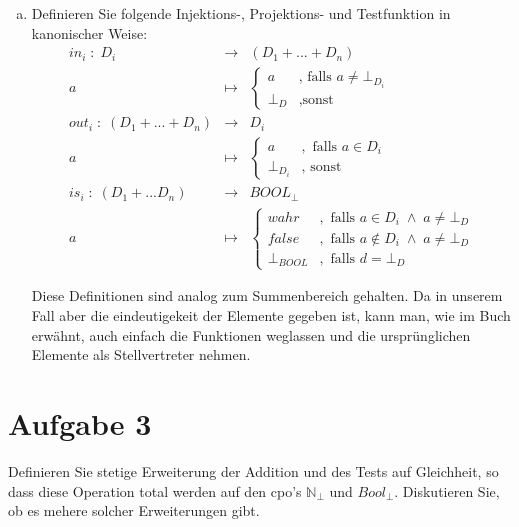 \documentclass[11pt,a4paper,ngerman]{article}
\begin{document}
\begin{enumerate}[(a)]
	\item Definieren Sie folgende Injektions-, Projektions- und Testfunktion in kanonischer Weise:\\
		$$\begin{array}{rcl}
			in_i \; : \; D_i &\longrightarrow& (D_1 + ... + D_n)\\
				a & \longmapsto & \left\{ \begin{array}{lr} a &\text{, falls }a\not= \bot_{D_i} \\ \bot_D &, \text{sonst} \end{array} \right.\\
			out_i \; : \; (D_1 + ... + D_n) &\longrightarrow& D_i\\
				a & \longmapsto & \left\{ \begin{array}{lr} a &,\text{ falls } a \in D_i \\ \bot_{D_i} &, \text{ sonst }\end{array} \right.\\
			is_i \; : \; (D_1 + ... D_n) &\longrightarrow& BOOL_\bot\\
				a & \longmapsto& \left\{ \begin{array}{lr}
					wahr &, \text{ falls }a \in D_i \; \land \; a \not= \bot_D\\
					false &, \text{ falls }a \not\in D_i  \; \land \; a \not= \bot_D\\
					\bot_{BOOL} &, \text{ falls } d = \bot_D
				\end{array} \right.
		\end{array}$$

	Diese Definitionen sind analog zum Summenbereich gehalten. Da in unserem Fall aber die eindeutigekeit der Elemente gegeben ist,
	kann man, wie im Buch erwähnt, auch einfach die Funktionen weglassen und die ursprünglichen Elemente als Stellvertreter nehmen.
\end{enumerate}

\pagebreak


\section*{Aufgabe 3}
Definieren Sie stetige Erweiterung der Addition und des Tests auf Gleichheit, so dass diese Operation total werden auf den cpo's $\mathbb{N}_\bot$ und $Bool_\bot$. Diskutieren Sie, ob es mehere solcher Erweiterungen gibt.\\
\end{document}

